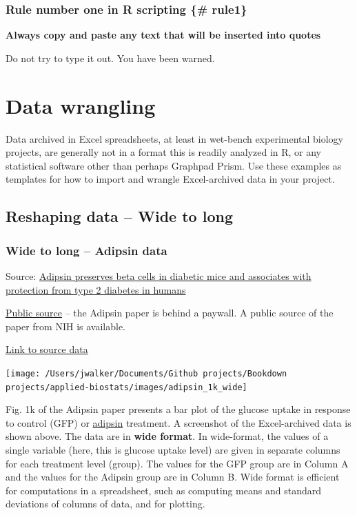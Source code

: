 \documentclass[]{book}
\begin{document}
\hypertarget{rule-number-one-in-r-scripting-rule1}{%
\subsubsection{Rule number one in R scripting \{\# rule1\}}\label{rule-number-one-in-r-scripting-rule1}}

\textbf{Always copy and paste any text that will be inserted into quotes}

Do not try to type it out. You have been warned.

\hypertarget{data-wrangling}{%
\section{Data wrangling}\label{data-wrangling}}

Data archived in Excel spreadsheets, at least in wet-bench experimental biology projects, are generally not in a format this is readily analyzed in R, or any statistical software other than perhaps Graphpad Prism. Use these examples as templates for how to import and wrangle Excel-archived data in your project.

\hypertarget{reshaping-data-wide-to-long}{%
\subsection{Reshaping data -- Wide to long}\label{reshaping-data-wide-to-long}}

\hypertarget{wide-to-long-adipsin-data}{%
\subsubsection{Wide to long -- Adipsin data}\label{wide-to-long-adipsin-data}}

Source: \href{https://www.nature.com/articles/s41591-019-0610-4}{Adipsin preserves beta cells in diabetic mice and associates with protection from type 2 diabetes in humans}

\href{https://www.ncbi.nlm.nih.gov/pmc/articles/PMC7256970/}{Public source} -- the Adipsin paper is behind a paywall. A public source of the paper from NIH is available.

\href{https://www.nature.com/articles/s41591-019-0610-4\#Sec39}{Link to source data}

\texttt{[image: /Users/jwalker/Documents/Github projects/Bookdown projects/applied-biostats/images/adipsin\_1k\_wide]}

Fig. 1k of the Adipsin paper presents a bar plot of the glucose uptake in response to control (GFP) or \href{https://en.wikipedia.org/wiki/Factor_D}{adipsin} treatment. A screenshot of the Excel-archived data is shown above. The data are in \textbf{wide format}. In wide-format, the values of a single variable (here, this is glucose uptake level) are given in separate columns for each treatment level (group). The values for the GFP group are in Column A and the values for the Adipsin group are in Column B. Wide format is efficient for computations in a spreadsheet, such as computing means and standard deviations of columns of data, and for plotting.
\end{document}
